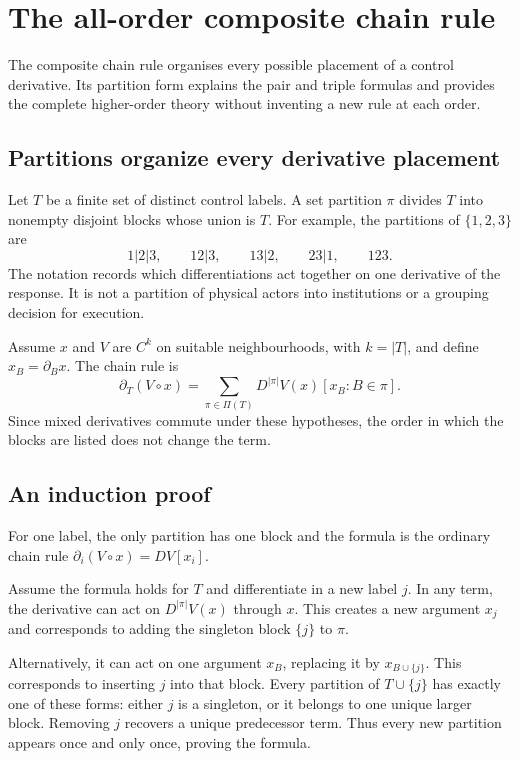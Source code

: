 \chapter{The all-order composite chain rule}\label{app:partitions}

The composite chain rule organises every possible placement of a control derivative. Its partition form explains the pair and triple formulas and provides the complete higher-order theory without inventing a new rule at each order.


\section{Partitions organize every derivative placement}
Let $T$ be a finite set of distinct control labels. A set partition $\pi$ divides $T$ into nonempty disjoint blocks whose union is $T$. For example, the partitions of $\{1,2,3\}$ are
\[
 1|2|3,\qquad 12|3,\qquad 13|2,\qquad 23|1,\qquad 123.
\]
The notation records which differentiations act together on one derivative of the response. It is not a partition of physical actors into institutions or a grouping decision for execution.

Assume $x$ and $V$ are $C^k$ on suitable neighbourhoods, with $k=|T|$, and define $x_B=\partial_Bx$. The chain rule is
\begin{equation}
 \partial_T(V\circ x)=
 \sum_{\pi\in\Pi(T)}D^{|\pi|}V(x)[x_B:B\in\pi].
\end{equation}
Since mixed derivatives commute under these hypotheses, the order in which the blocks are listed does not change the term.

\section{An induction proof}
For one label, the only partition has one block and the formula is the ordinary chain rule $\partial_i(V\circ x)=DV[x_i]$.

Assume the formula holds for $T$ and differentiate in a new label $j$. In any term, the derivative can act on $D^{|\pi|}V(x)$ through $x$. This creates a new argument $x_j$ and corresponds to adding the singleton block $\{j\}$ to $\pi$.

Alternatively, it can act on one argument $x_B$, replacing it by $x_{B\cup\{j\}}$. This corresponds to inserting $j$ into that block. Every partition of $T\cup\{j\}$ has exactly one of these forms: either $j$ is a singleton, or it belongs to one unique larger block. Removing $j$ recovers a unique predecessor term. Thus every new partition appears once and only once, proving the formula.

